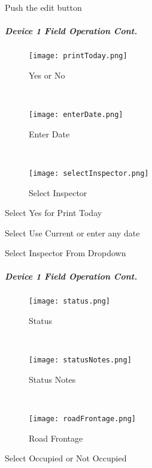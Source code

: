 {\normalsize Push the} {\Large edit} {\normalsize button}
\clearpage
\subparagraph*{Device 1 Field Operation Cont.}
\begin{wrapfigure}{r}{0.4\textwidth}
\centering
    \texttt{[image: printToday.png]}
\caption {Yes or No}
\vspace{.05in}

\HRule \\[.4cm] %
\vspace{.05in}

    \texttt{[image: enterDate.png]}
\caption{Enter Date}
\vspace{.05in}

\HRule \\[.4cm] %
\vspace{.05in}

    \texttt{[image: selectInspector.png]}
\caption{Select Inspector}
\end{wrapfigure}
Select Yes for Print Today
\vspace{2.5in}

\noindent Select Use Current or enter any date
\vspace{2in}

\noindent Select Inspector From Dropdown
\clearpage
\subparagraph*{Device 1 Field Operation Cont.}
\begin{wrapfigure}{r}{0.4\textwidth}
\centering
    \texttt{[image: status.png]}
\caption {Status}
\vspace{.05in}

\HRule \\[.4cm] %
\vspace{.05in}

    \texttt{[image: statusNotes.png]}
\caption{Status Notes}
\vspace{.05in}

\HRule \\[.4cm] %
\vspace{.05in}

    \texttt{[image: roadFrontage.png]}
\caption{Road Frontage}
\end{wrapfigure}
Select Occupied or Not Occupied
\vspace{2.5in}

